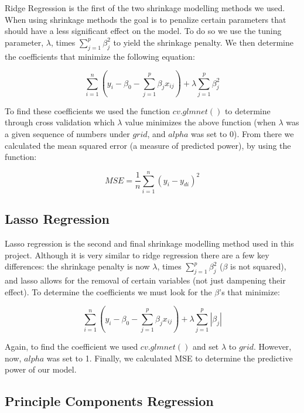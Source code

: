 \documentclass{article}\usepackage[]{graphicx}\usepackage[]{color}
\begin{document}
Ridge Regression is the first of the two shrinkage modelling methods we used.  When using shrinkage methods the goal is to penalize certain parameters that should have a less significant effect on the model. To do so we use the tuning parameter, $\lambda$, times $\sum_{j=1}^{p}\beta_{j}^{2}$ to yield the shrinkage penalty. We then determine the coefficients that minimize the following equation:

\begin{equation}
\sum_{i=1}^{n}(y_i-\beta_0-\sum_{j=1}^{p}\beta_jx_{ij}) + \lambda\sum_{j=1}^{p}\beta_{j}^{2}
\end{equation}

To find these coefficients we used the function $cv.glmnet()$ to determine through cross validation which $\lambda$ value minimizes the above function (when $\lambda$ was a given sequence of numbers under $grid$, and $alpha$ was set to 0). From there we calculated the mean squared error (a measure of predicted power), by using the function:

\begin{equation}
MSE = \frac{1}{n}\sum_{i=1}^{n}(y_i - y_{di})^2
\end{equation}

\subsection{Lasso Regression}

Lasso regression is the second and final shrinkage modelling method used in this project. Although it is very similar to ridge regression there are a few key differences: the shrinkage penalty is now $\lambda$, times $\sum_{j=1}^{p}\beta_{j}^{2}$ ($\beta$ is not squared), and lasso allows for the removal of certain variables (not just dampening their effect). To determine the coefficients we must look for the $\beta$'s that minimize:

\begin{equation}
\sum_{i=1}^{n}(y_i-\beta_0-\sum_{j=1}^{p}\beta_jx_{ij}) + \lambda\sum_{j=1}^{p}|\beta_{j}|
\end{equation}

Again, to find the coefficient we used $cv.glmnet()$ and set $\lambda$ to $grid$. However, now, $alpha$ was set to 1. Finally, we calculated MSE to determine the predictive power of our model.

\subsection{Principle Components Regression}
\end{document}
